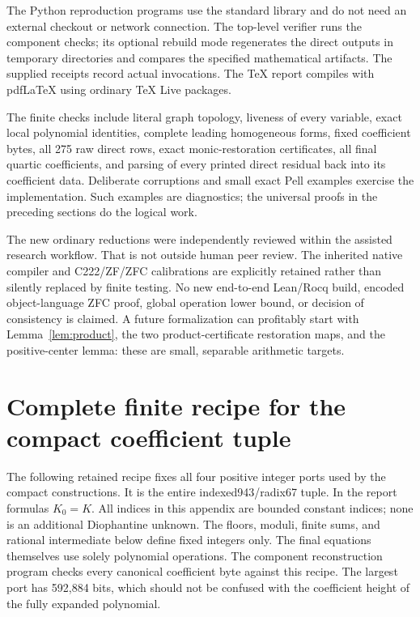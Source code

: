 \documentclass[11pt,letterpaper]{article}
\theoremstyle{remark}\newtheorem{remark}[theorem]{Remark}
\begin{document}
The Python reproduction programs use the standard library and do not need
an external checkout or network connection. The top-level verifier runs the
component checks; its optional rebuild mode regenerates the direct outputs
in temporary directories and compares the specified mathematical artifacts.
The supplied receipts record actual invocations. The TeX report compiles with
pdfLaTeX using ordinary TeX Live packages.

The finite checks include literal graph topology, liveness of every variable,
exact local polynomial identities, complete leading homogeneous forms,
fixed coefficient bytes, all 275 raw direct rows, exact monic-restoration
certificates, all final quartic coefficients, and parsing of every printed
direct residual back into its coefficient data. Deliberate corruptions and
small exact Pell examples exercise the implementation. Such examples are
diagnostics; the universal proofs in the preceding sections do the logical work.

The new ordinary reductions were independently reviewed within the assisted
research workflow. That is not outside human peer review. The inherited
native compiler and C222/ZF/ZFC calibrations are explicitly retained rather
than silently replaced by finite testing. No new end-to-end Lean/Rocq build,
encoded object-language ZFC proof, global operation lower bound, or decision
of consistency is claimed. A future formalization can profitably start with
Lemma~\ref{lem:product}, the two product-certificate restoration maps, and the
positive-center lemma: these are small, separable arithmetic targets.

\appendix
\clearpage
\section{Complete finite recipe for the compact coefficient tuple}
\label{app:constants}

The following retained recipe fixes all four positive integer ports used by
the compact constructions. It is the entire indexed943/radix67 tuple.
In the report formulas $K_0=K$. All indices in this appendix are bounded
constant indices; none is an additional Diophantine unknown. The floors,
moduli, finite sums, and rational intermediate below define fixed integers
only. The final equations themselves use solely polynomial operations.
The component reconstruction program checks every canonical coefficient
byte against this recipe. The largest port has 592,884 bits, which should
not be confused with the coefficient height of the fully expanded polynomial.
\end{document}
